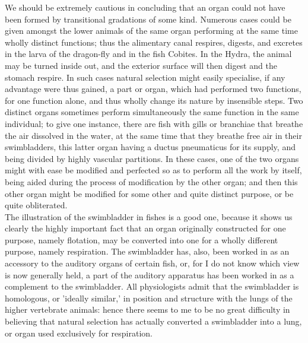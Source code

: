 \indent We should be extremely cautious in concluding that an organ could not have been formed by transitional gradations of some kind. Numerous cases could be given amongst the lower animals of the same organ performing at the same time wholly distinct functions; thus the alimentary canal respires, digests, and excretes in the larva of the dragon-fly and in the fish Cobites. In the Hydra, the animal may be turned inside out, and the exterior surface will then digest and the stomach respire. In such cases natural selection might easily specialise, if any advantage were thus gained, a part or organ, which had performed two functions, for one function alone, and thus wholly change its nature by insensible steps. Two distinct organs sometimes perform simultaneously the same function in the same individual; to give one instance, there are fish with gills or branchiae that breathe the air dissolved in the water, at the same time that they breathe free air in their swimbladders, this latter organ having a ductus pneumaticus for its supply, and being divided by highly vascular partitions. In these cases, one of the two organs might with ease be modified and perfected so as to perform all the work by itself, being aided during the process of modification by the other organ; and then this other organ might be modified for some other and quite distinct purpose, or be quite obliterated.\\
\indent The illustration of the swimbladder in fishes is a good one, because it shows us clearly the highly important fact that an organ originally constructed for one purpose, namely flotation, may be converted into one for a wholly different purpose, namely respiration. The swimbladder has, also, been worked in as an accessory to the auditory organs of certain fish, or, for I do not know which view is now generally held, a part of the auditory apparatus has been worked in as a complement to the swimbladder. All physiologists admit that the swimbladder is homologous, or 'ideally similar,' in position and structure with the lungs of the higher vertebrate animals: hence there seems to me to be no great difficulty in believing that natural selection has actually converted a swimbladder into a lung, or organ used exclusively for respiration.\\
